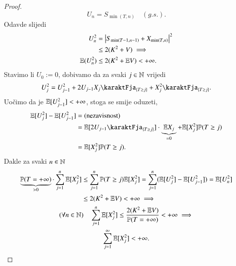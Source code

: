 \begin{proof}
    \begin{equation*}
        U_n = S_{\min (T, n)} \quad (g.s.).
    \end{equation*}
    Odavde slijedi
    \begin{equation*}
        \begin{aligned}
            U_n^2 &= \big| S_{\min (T - 1, n - 1)} + X_{\min (T, n)} \big|^2\\
            &\leq 2 (K^2 + V) \implies\\
            \mathbb{E} (U_n^2) &\leq 2 (K^2 + \mathbb{E} V) < +\infty.
        \end{aligned}
    \end{equation*}
    Stavimo li $U_0 := 0$, dobivamo da za svaki $j \in \mathbb{N}$ vrijedi
    \begin{equation*}
        U_j^2 = U_{j - 1}^2 + 2 U_{j - 1} X_j \karaktFja_{\{ T \geq j \}} + X_j^2 \karaktFja_{\{ T \geq j \}}.
    \end{equation*}
    Uo\v cimo da je $\mathbb{E} [ U_{j - 1}^2 ] < + \infty$, stoga se smije oduzeti,
    \begin{equation*}
        \begin{aligned}
            \masE [U_j^2] - \masE [U_{j - 1}^2] &= (\textnormal{nezavisnost})\\
            &= \masE [2 U_{j - 1} \karaktFja_{\{ T \geq j \}}] \cdot \underbrace{\masE X_j}_{= 0} + \masE [X_j^2] \masP (T \geq j)\\
            &= \masE [X_j^2] \masP (T \geq j).
        \end{aligned}
    \end{equation*}
    Dakle za svaki $n \in \mathbb{N}$
    \begin{equation*}
        \begin{gathered}
            \begin{aligned}
                \underbrace{\mathbb{P} ( T = +\infty )}_{> 0} \cdot \sum\limits_{j = 1}^{n} \mathbb{E} [X_j^2] &\leq \sum\limits_{j = 1}^{n} \mathbb{P} (T \geq j) \mathbb{E} [X_j^2] = \sum\limits_{j = 1}^{n} (\mathbb{E} [U_j^2] - \mathbb{E} [U_{j - 1}^2]) = \mathbb{E} [U_n^2]\\
                &\leq 2(K^2 + \mathbb{E} V ) < +\infty \implies 
            \end{aligned}\\
            (\forall n \in \mathbb{N}) \quad \sum\limits_{j = 1}^{n} \mathbb{E} [X_j^2] \leq \frac{2 (K^2 + \mathbb{E} V)}{\mathbb{P} (T = +\infty)} < + \infty \implies\\
            \sum\limits_{j = 1}^{\infty} \mathbb{E} [X_j^2] < +\infty.
        \end{gathered}
    \end{equation*}
\end{proof}

